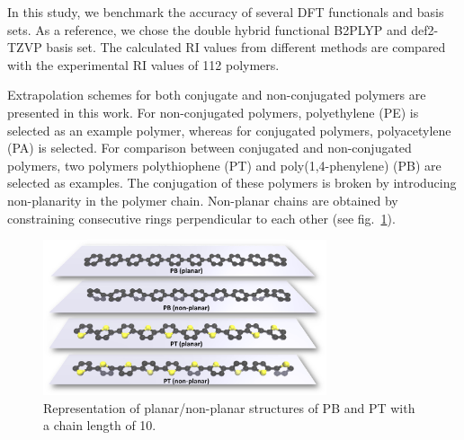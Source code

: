 In this study, we benchmark the accuracy of several DFT functionals and basis sets. As a reference, we chose the double hybrid functional B2PLYP \cite{Grimme2006} and def2-TZVP basis set. 
The calculated RI values from different methods are compared with the experimental RI values of 112 polymers.








Extrapolation schemes for both conjugate and non-conjugated polymers are presented in this work. 
For non-conjugated polymers, polyethylene (PE) is selected as an example polymer, whereas for conjugated polymers, polyacetylene (PA) is selected. For comparison between conjugated and non-conjugated polymers, two polymers polythiophene (PT) and poly(1,4-phenylene) (PB) are selected as examples. The conjugation of these polymers is broken by introducing non-planarity in the polymer chain. Non-planar chains are obtained by constraining consecutive rings perpendicular to each other (see fig.\ \ref{fig:PB_PT_structure}).

\begin{figure}[htbp] 
	\centering
	\includegraphics[width=0.744\textwidth]{Chapter-3/Figures/PB_PT_structure.eps}
	\caption{Representation of planar/non-planar structures of PB and PT with a chain length of 10.} 
	\label{fig:PB_PT_structure} 
\end{figure}  

